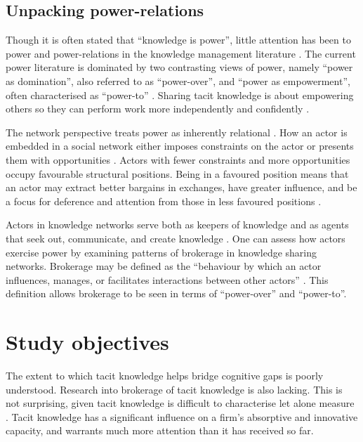\subsection{Unpacking power-relations}

Though it is often stated that \enquote{knowledge is power}, little attention has been  to power and power-relations in the knowledge management literature \citep{heizmann2015power}. The current power literature is dominated by two contrasting views of power, namely \enquote{power as domination}, also referred to as \enquote{power-over}, and \enquote{power as empowerment}, often characterised as \enquote{power-to} \citep{haugaard2012rethinking}. Sharing tacit knowledge is about empowering others so they can perform work more independently and confidently \citep{bordum2002tacit,lin2007share}. \medskip

The network perspective treats power as inherently relational \citep{ibarra1993network}. How an actor is embedded in a social network either imposes constraints on the actor or presents them with opportunities \citep{burt1992structural,simpson2011network}. Actors with fewer constraints and more opportunities occupy favourable structural positions. Being in a favoured position means that an actor may extract better bargains in exchanges, have greater influence, and be a focus for deference and attention from those in less favoured positions \citep{burt1992structural,hanneman2005introduction,simpson2011network}. \medskip

Actors in knowledge networks serve both as keepers of knowledge and as agents that seek out, communicate, and create knowledge \citep{phelps2012knowledge}. One can assess how actors exercise power by examining patterns of brokerage in knowledge sharing networks. Brokerage may be defined as the \enquote{behaviour by which an actor influences, manages, or facilitates interactions between other actors} \citep{obstfeld2014brokerage}. This definition allows brokerage to be seen in terms of \enquote{power-over} and \enquote{power-to}. \medskip
 
\section{Study objectives}

The extent to which tacit knowledge helps bridge cognitive gaps is poorly understood. Research into brokerage of tacit knowledge is also lacking. This is not surprising, given tacit knowledge is difficult to characterise let alone measure \citep{zander1995knowledge,cavusgil2003tacit}. Tacit knowledge has a significant influence on a firm's absorptive and innovative capacity, and warrants much more attention than it has received so far. \medskip

